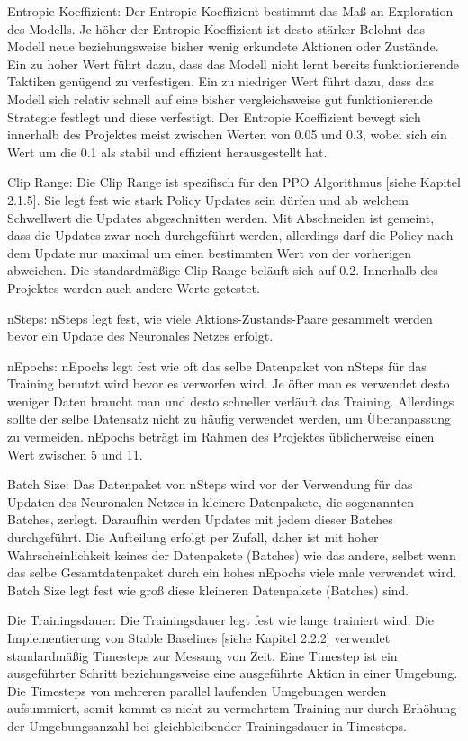 Entropie Koeffizient: Der Entropie Koeffizient bestimmt das Maß an Exploration des Modells. Je höher der Entropie Koeffizient ist desto stärker Belohnt das Modell neue beziehungsweise bisher wenig erkundete Aktionen oder Zustände. Ein zu hoher Wert führt dazu, dass das Modell nicht lernt bereits funktionierende Taktiken genügend zu verfestigen. Ein zu niedriger Wert führt dazu, dass das Modell sich relativ schnell auf eine bisher vergleichsweise gut funktionierende Strategie festlegt und diese verfestigt. Der Entropie Koeffizient bewegt sich innerhalb des Projektes meist zwischen Werten von 0.05 und 0.3, wobei sich ein Wert um die 0.1 als stabil und effizient herausgestellt hat.

Clip Range: Die Clip Range ist spezifisch für den PPO Algorithmus [siehe Kapitel 2.1.5]. Sie legt fest wie stark Policy Updates sein dürfen und ab welchem Schwellwert die Updates abgeschnitten werden. Mit Abschneiden ist gemeint, dass die Updates zwar noch durchgeführt werden, allerdings darf die Policy nach dem Update nur maximal um einen bestimmten Wert von der vorherigen abweichen. Die standardmäßige Clip Range beläuft sich auf 0.2. Innerhalb des Projektes werden auch andere Werte getestet.

nSteps: nSteps legt fest, wie viele Aktions-Zustands-Paare gesammelt werden bevor ein Update des Neuronales Netzes erfolgt.

nEpochs: nEpochs legt fest wie oft das selbe Datenpaket von nSteps für das Training benutzt wird bevor es verworfen wird. Je öfter man es verwendet desto weniger Daten braucht man und desto schneller verläuft das Training. Allerdings sollte der selbe Datensatz nicht zu häufig verwendet werden, um Überanpassung zu vermeiden. nEpochs beträgt im Rahmen des Projektes üblicherweise einen Wert zwischen 5 und 11.

Batch Size: Das Datenpaket von nSteps wird vor der Verwendung für das Updaten des Neuronalen Netzes in kleinere Datenpakete, die sogenannten Batches, zerlegt. Daraufhin werden Updates mit jedem dieser Batches durchgeführt. Die Aufteilung erfolgt per Zufall, daher ist mit hoher Wahrscheinlichkeit keines der Datenpakete (Batches) wie das andere, selbst wenn das selbe Gesamtdatenpaket durch ein hohes nEpochs viele male verwendet wird. Batch Size legt fest wie groß diese kleineren Datenpakete (Batches) sind.

Die Trainingsdauer: Die Trainingsdauer legt fest wie lange trainiert wird. Die Implementierung von Stable Baselines [siehe Kapitel 2.2.2] verwendet standardmäßig Timesteps zur Messung von Zeit. Eine Timestep ist ein ausgeführter Schritt beziehungsweise eine ausgeführte Aktion in einer Umgebung. Die Timesteps von mehreren parallel laufenden Umgebungen werden aufsummiert, somit kommt es nicht zu vermehrtem Training nur durch Erhöhung der Umgebungsanzahl bei gleichbleibender Trainingsdauer in Timesteps.
